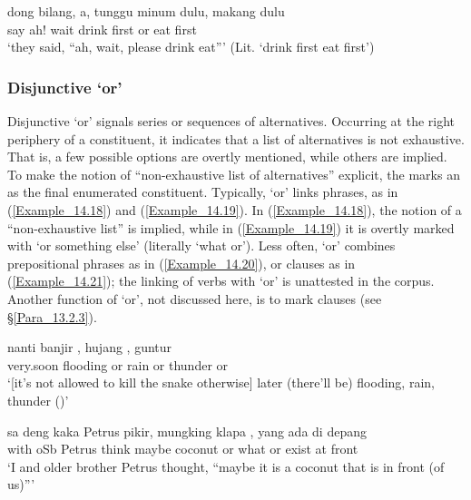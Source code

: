 \ea
\label{Example_14.17}
\gll       dong  bilang,  a,  tunggu  minum  dulu,    makang  dulu\\  
  say  ah!  wait  drink  first  or  eat  first\\
\glt ‘they said, ``ah, wait, please drink  eat''' (Lit. ‘drink first  eat first’) \textstyleExampleSource{[080925-003-Cv.0111]}\\
\z


\subsubsection[Disjunctive ka ‘or’]{Disjunctive  ‘or’}
\label{Para_14.2.2.2}
Disjunctive  ‘or’ signals series or sequences of alternatives. Occurring at the right periphery of a constituent, it indicates that a list of alternatives is not exhaustive. That is, a few possible options are overtly mentioned, while others are implied. To make the notion of ``non-exhaustive list of alternatives'' explicit, the  marks an  as the final enumerated constituent. Typically,   ‘or’ links  phrases, as in (\ref{Example_14.18}) and (\ref{Example_14.19}). In (\ref{Example_14.18}), the notion of a ``non-exhaustive list'' is implied, while in (\ref{Example_14.19}) it is overtly marked with  ‘or something else’ (literally ‘what or’). Less often,  ‘or’ combines prepositional phrases as in (\ref{Example_14.20}), or clauses as in (\ref{Example_14.21}); the linking of verbs with  ‘or’ is unattested in the corpus. Another function of  ‘or’, not discussed here, is to mark  clauses (see §\ref{Para_13.2.3}).
%

\ea
\label{Example_14.18}
\gll {\ldots} {nanti} {banjir} {,} {hujang} {,} {guntur} {}\\ %
   {} very.soon  flooding  or  rain  or  thunder  or\\
\glt ‘[it’s not allowed to kill the snake otherwise] later (there’ll be) flooding,  rain,  thunder ()’ \textstyleExampleSource{[081006-022-CvEx.0004]}
\z

\ea
\label{Example_14.19}
\gll       sa  deng  kaka  Petrus  pikir,  mungking  klapa  ,       yang  ada  di  depang\\  
  with  oSb  Petrus  think  maybe  coconut  or  what  or     exist  at  front\\
 ‘I and older brother Petrus thought, ``maybe it is a coconut  that is in front (of us)''' \textstyleExampleSource{[081023-004-Cv.0002]}
\z

